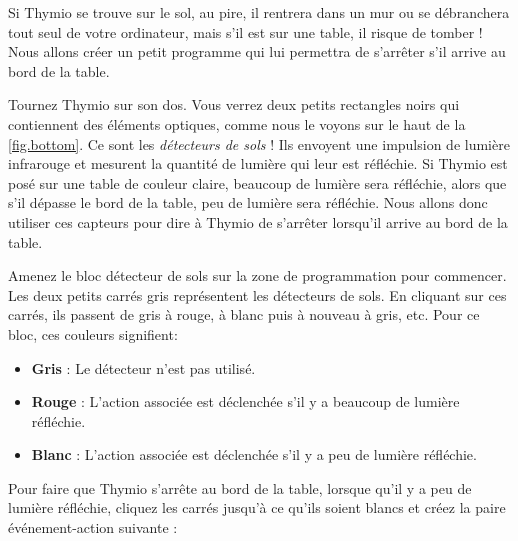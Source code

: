 
Si Thymio se trouve sur le sol, au pire, il rentrera dans un mur ou se débranchera tout seul de votre ordinateur, mais s'il est sur une table, il risque de tomber !
Nous allons créer un petit programme qui lui permettra de s'arrêter s'il arrive au bord de la table.


Tournez Thymio sur son dos. Vous verrez deux petits rectangles noirs qui contiennent des éléments optiques, comme nous le voyons sur le haut de la \cref{fig.bottom}.
Ce sont les \emph{détecteurs de sols} !
Ils envoyent une impulsion de lumière infrarouge et mesurent la quantité de lumière qui leur est réfléchie.
Si Thymio est posé sur une table de couleur claire, beaucoup de lumière sera réfléchie, alors que s'il dépasse le bord de la table, peu de lumière sera réfléchie.
Nous allons donc utiliser ces capteurs pour dire à Thymio de s'arrêter lorsqu'il arrive au bord de la table.


Amenez le bloc détecteur de sols  sur la zone de programmation pour commencer.
Les deux petits carrés gris représentent les détecteurs de sols.
En cliquant sur ces carrés, ils passent de gris à rouge, à blanc puis à nouveau à gris, etc. Pour ce bloc, ces couleurs signifient:

\begin{itemize}
\item \textbf{Gris} : Le détecteur n'est pas utilisé.
\item \textbf{Rouge} : L'action associée est déclenchée s'il y a beaucoup de lumière réfléchie.
\item \textbf{Blanc} : L'action associée est déclenchée s'il y a peu de lumière réfléchie.
\end{itemize}


Pour faire que Thymio s'arrête au bord de la table, lorsque qu'il y a peu de lumière réfléchie, cliquez les carrés jusqu'à ce qu'ils soient blancs et créez la paire événement-action suivante : 


